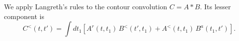 \documentclass{article}
\begin{document}
We apply Langreth's rules to the contour convolution $C = A * B$. Its lesser component is
\begin{equation}
C^{<}(t,t') = \int dt_1 \left[ A^{r}(t,t_1)\, B^{<}(t',t_1) + A^{<}(t,t_1)\, B^{a}(t_1,t') \right] .
\label{eq:lang}
\end{equation}
\end{document}
